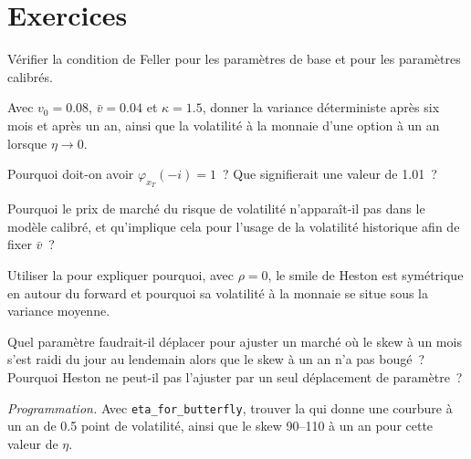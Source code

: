 \section{Exercices}

\begin{exercise}[$\star$]\label{exo:dv:stochastic-volatility:1}
Vérifier la condition de Feller pour les paramètres de base et pour les paramètres calibrés.
\end{exercise}

\begin{exercise}[$\star$]\label{exo:dv:stochastic-volatility:2}
Avec $v_0=0.08$, $\bar v=0.04$ et $\kappa=1.5$, donner la variance déterministe après six mois et après un an,
ainsi que la volatilité à la monnaie d'une option à un an lorsque $\eta\to0$.
\end{exercise}

\begin{exercise}[$\star$]\label{exo:dv:stochastic-volatility:3}
Pourquoi doit-on avoir $\varphi_{x_T}(-i)=1$~? Que signifierait une valeur de 1.01~?
\end{exercise}

\begin{exercise}[$\star\star$]\label{exo:dv:stochastic-volatility:4}
Pourquoi le prix de marché du risque de volatilité n'apparaît-il pas dans le modèle calibré, et qu'implique cela
pour l'usage de la volatilité historique afin de fixer $\bar v$~?
\end{exercise}

\begin{exercise}[$\star\star$]\label{exo:dv:stochastic-volatility:5}
Utiliser la  pour expliquer pourquoi, avec $\rho=0$, le smile de Heston est symétrique en  autour du
forward et pourquoi sa volatilité à la monnaie se situe sous la variance moyenne.
\end{exercise}

\begin{exercise}[$\star\star$]\label{exo:dv:stochastic-volatility:6}
Quel paramètre faudrait-il déplacer pour ajuster un marché où le skew à un mois s'est raidi du jour au lendemain alors que le skew à un an
n'a pas bougé~? Pourquoi Heston ne peut-il pas l'ajuster par un seul déplacement de paramètre~?
\end{exercise}

\begin{exercise}[$\star\star\star$]\label{exo:dv:stochastic-volatility:7}
\emph{Programmation.} Avec \texttt{eta\_for\_butterfly}, trouver la  qui donne une courbure à un an
de 0.5 point de volatilité, ainsi que le skew 90--110 à un an pour cette valeur de $\eta$.
\end{exercise}

